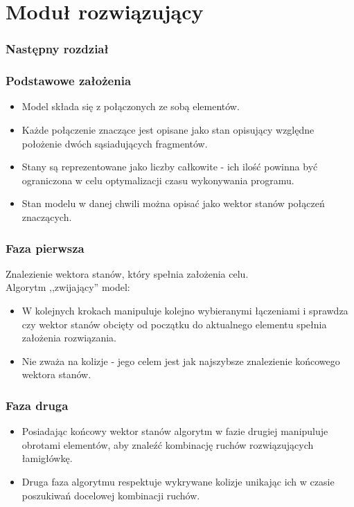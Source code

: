 \documentclass{beamer}
\begin{document}
    \section{Moduł rozwiązujący}
    \begin{frame}
    	\frametitle{Następny rozdział}
        \tableofcontents[currentsection]
    \end{frame}
    \begin{frame}
    	\frametitle{Podstawowe założenia}
        \begin{itemize}
            \item Model składa się z połączonych ze sobą elementów.
            \item Każde połączenie znaczące jest opisane jako stan opisujący względne położenie dwóch 							sąsiadujących fragmentów.
            \item Stany są reprezentowane jako liczby całkowite - ich ilość powinna być ograniczona w celu 						optymalizacji czasu wykonywania programu.
            \item Stan modelu w danej chwili można opisać jako wektor stanów połączeń znaczących.
        \end{itemize}
    \end{frame}
    \begin{frame}
    	\frametitle{Faza pierwsza}
        Znalezienie wektora stanów, który spełnia założenia celu.\\
        Algorytm ,,zwijający'' model:
        \begin{itemize}
            \item W kolejnych krokach manipuluje kolejno wybieranymi łączeniami i sprawdza czy wektor stanów 						obcięty od początku do aktualnego elementu spełnia założenia rozwiązania.
            \item Nie zważa na kolizje - jego celem jest jak najszybsze znalezienie końcowego wektora stanów.
        \end{itemize}
    \end{frame}
    \begin{frame}
    	\frametitle{Faza druga}
        \begin{itemize}
        	\item Posiadając końcowy wektor stanów algorytm w fazie drugiej manipuluje obrotami elementów, aby znaleźć kombinację ruchów rozwiązujących łamigłówkę.\\
        	\item Druga faza algorytmu respektuje wykrywane kolizje unikając ich w czasie poszukiwań docelowej 					kombinacji ruchów.
		\end{itemize}
    \end{frame}
\end{document}

